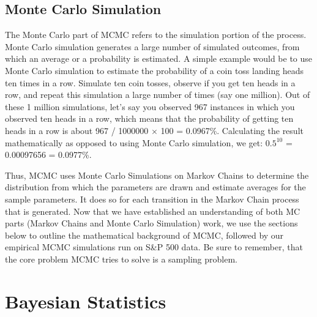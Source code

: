 \documentclass[letterpaper]{article}
\begin{document}
\subsection{Monte Carlo Simulation}

The Monte Carlo part of MCMC refers to the simulation portion of the process. Monte Carlo simulation generates a large number of simulated outcomes, from which an average or a probability is estimated. A simple example would be to use Monte Carlo simulation to estimate the probability of a coin toss landing heads ten times in a row. Simulate ten coin tosses, observe if you get ten heads in a row, and repeat this simulation a large number of times (say one million). Out of these 1 million simulations, let's say you observed 967 instances in which you observed ten heads in a row, which means that the probability of getting ten heads in a row is about 967 / 1000000 $\times$ 100 = 0.0967\%. Calculating the result mathematically as opposed to using Monte Carlo simulation, we get: $0.5^{10}$ = 0.00097656 = 0.0977\%.



Thus, MCMC uses Monte Carlo Simulations on Markov Chains to determine the distribution from which the parameters are drawn and estimate averages for the sample parameters. It does so for each transition in the Markov Chain process that is generated. Now that we have established an understanding of both MC parts (Markov Chains and Monte Carlo Simulation) work, we use the sections below to outline the mathematical background of MCMC, followed by our empirical MCMC simulations run on S\&P 500 data. Be sure to remember, that the core problem MCMC tries to solve is a sampling problem.

\section{Bayesian Statistics}
\end{document}
